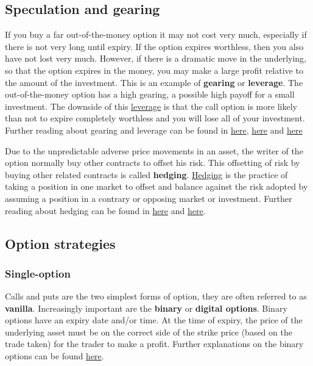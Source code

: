 \subsection{Speculation and gearing}
If you buy a far out-of-the-money option it may not cost very much, especially if there is not very long until expiry. If the option expires worthless, then you also have not lost very much. However, if there is a dramatic move in the underlying, so that the option expires in the money, you may make a large profit relative to the amount of the investment. This is an example of \textbf{gearing} or \textbf{leverage}. The out-of-the-money option has a high gearing, a possible high payoff for a small investment. The downside of this \href{https://en.wikipedia.org/wiki/Leverage_(finance)}{leverage} is that the call option is more likely than not to expire completely worthless and you will lose all of your investment. Further reading about gearing and leverage can be found in \href{https://www.investopedia.com/terms/l/leverageratio.asp}{here}, \href{https://www.investopedia.com/terms/g/gearingratio.asp}{here} and \href{https://specialties.bayt.com/en/specialties/q/146664/what-is-the-difference-between-leverage-ratio-and-gearing-ratio/}{here}

Due to the unpredictable adverse price movements in an asset, the writer of the option normally buy other contracts to offset his risk. This offsetting of risk by buying other related contracts is called \textbf{hedging}. \href{https://en.wikipedia.org/wiki/Hedge_(finance)}{Hedging} is the practice of taking a position in one market to offset and balance against the risk adopted by assuming a position in a contrary or opposing market or investment. Further reading about hedging can be found in \href{https://www.investopedia.com/terms/h/hedge.asp}{here} and \href{https://www.investopedia.com/trading/hedging-beginners-guide/}{here}.


\subsection{Option strategies}
\subsubsection{Single-option}
Calls and puts are the two simplest forms of option, they are often referred to as \textbf{vanilla}. Increasingly important are the \textbf{binary} or \textbf{digital options}. Binary options have an expiry date and/or time. At the time of expiry, the price of the underlying asset must be on the correct side of the strike price (based on the trade taken) for the trader to make a profit. Further explanations on the binary options can be found \href{https://www.investopedia.com/terms/b/binary-option.asp}{here}.

